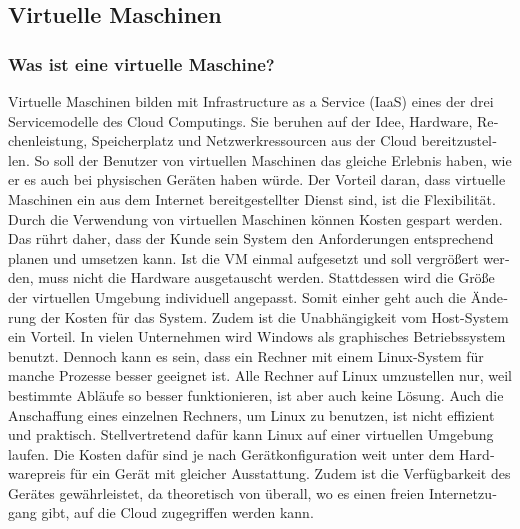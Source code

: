 \begin{otherlanguage}{ngerman}
\subsection{Virtuelle Maschinen}
\subsubsection{Was ist eine virtuelle Maschine?}
Virtuelle Maschinen bilden mit Infrastructure as a Service (IaaS) eines der drei Servicemodelle des Cloud Computings. Sie beruhen auf der Idee, Hardware, Rechenleistung, Speicherplatz und Netzwerkressourcen aus der Cloud bereitzustellen. So soll der Benutzer von virtuellen Maschinen das gleiche Erlebnis haben, wie er es auch bei physischen Geräten haben würde. 
\newline 
\newline
Der Vorteil daran, dass virtuelle Maschinen ein aus dem Internet bereitgestellter Dienst sind, ist die Flexibilität. Durch die Verwendung von virtuellen Maschinen können Kosten gespart werden. Das rührt daher, dass der Kunde sein System den Anforderungen entsprechend planen und umsetzen kann. Ist die VM einmal aufgesetzt und soll vergrößert werden, muss nicht die Hardware ausgetauscht werden. Stattdessen wird die Größe der virtuellen Umgebung individuell angepasst. Somit einher geht auch die Änderung der Kosten für das System. 
\newline 
Zudem ist die Unabhängigkeit vom Host-System ein Vorteil. In vielen Unternehmen wird Windows als graphisches Betriebssystem benutzt. Dennoch kann es sein, dass ein Rechner mit einem Linux-System für manche Prozesse besser geeignet ist. Alle Rechner auf Linux umzustellen nur, weil bestimmte Abläufe so besser funktionieren, ist aber auch keine Lösung. Auch die Anschaffung eines einzelnen Rechners, um Linux zu benutzen, ist nicht effizient und praktisch. Stellvertretend dafür kann Linux auf einer virtuellen Umgebung laufen. Die Kosten dafür sind je nach Gerätkonfiguration weit unter dem Hardwarepreis für ein Gerät mit gleicher Ausstattung. Zudem ist die Verfügbarkeit des Gerätes gewährleistet, da theoretisch von überall, wo es einen freien Internetzugang gibt, auf die Cloud zugegriffen werden kann. 




\end{otherlanguage}
